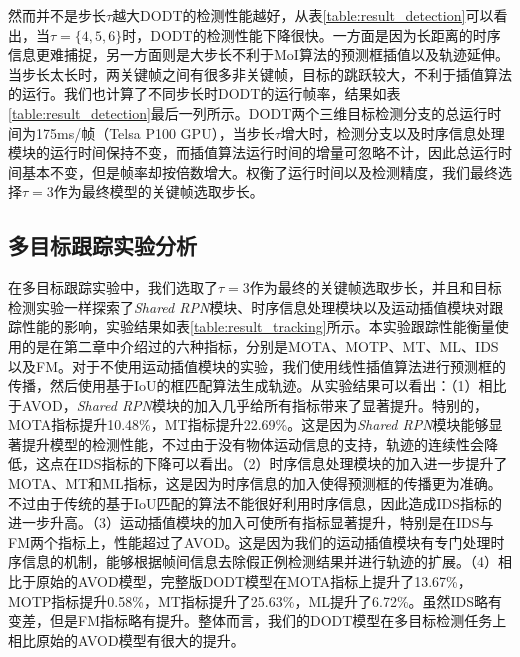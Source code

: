 然而并不是步长$\tau$越大DODT的检测性能越好，从表\ref{table:result_detection}可以看出，当$\tau = \{4,5,6\}$时，DODT的检测性能下降很快。一方面是因为长距离的时序信息更难捕捉，另一方面则是大步长不利于MoI算法的预测框插值以及轨迹延伸。当步长太长时，两关键帧之间有很多非关键帧，目标的跳跃较大，不利于插值算法的运行。我们也计算了不同步长时DODT的运行帧率，结果如表\ref{table:result_detection}最后一列所示。DODT两个三维目标检测分支的总运行时间为175ms/帧（Telsa P100 GPU），当步长$\tau$增大时，检测分支以及时序信息处理模块的运行时间保持不变，而插值算法运行时间的增量可忽略不计，因此总运行时间基本不变，但是帧率却按倍数增大。权衡了运行时间以及检测精度，我们最终选择$\tau = 3$作为最终模型的关键帧选取步长。

\subsection{多目标跟踪实验分析}
\label{mot_result}


在多目标跟踪实验中，我们选取了$\tau = 3$作为最终的关键帧选取步长，并且和目标检测实验一样探索了\textit{Shared RPN}模块、时序信息处理模块以及运动插值模块对跟踪性能的影响，实验结果如表\ref{table:result_tracking}所示。本实验跟踪性能衡量使用的是在第二章中介绍过的六种指标，分别是MOTA、MOTP、MT、ML、IDS以及FM。对于不使用运动插值模块的实验，我们使用线性插值算法进行预测框的传播，然后使用基于IoU的框匹配算法生成轨迹。从实验结果可以看出：（1）相比于AVOD，\textit{Shared RPN}模块的加入几乎给所有指标带来了显著提升。特别的，MOTA指标提升10.48\%，MT指标提升22.69\%。这是因为\textit{Shared RPN}模块能够显著提升模型的检测性能，不过由于没有物体运动信息的支持，轨迹的连续性会降低，这点在IDS指标的下降可以看出。（2）时序信息处理模块的加入进一步提升了MOTA、MT和ML指标，这是因为时序信息的加入使得预测框的传播更为准确。不过由于传统的基于IoU匹配的算法不能很好利用时序信息，因此造成IDS指标的进一步升高。（3）运动插值模块的加入可使所有指标显著提升，特别是在IDS与FM两个指标上，性能超过了AVOD。这是因为我们的运动插值模块有专门处理时序信息的机制，能够根据帧间信息去除假正例检测结果并进行轨迹的扩展。（4）相比于原始的AVOD模型，完整版DODT模型在MOTA指标上提升了13.67\%，MOTP指标提升0.58\%，MT指标提升了25.63\%，ML提升了6.72\%。虽然IDS略有变差，但是FM指标略有提升。整体而言，我们的DODT模型在多目标检测任务上相比原始的AVOD模型有很大的提升。



